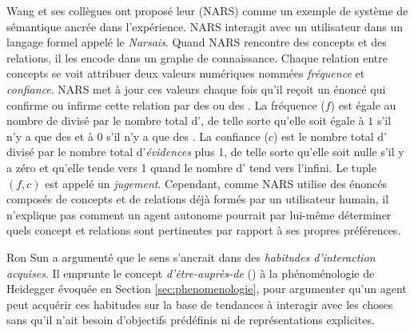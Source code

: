 Wang et ses collègues ont proposé leur  (NARS) comme un exemple de système de sémantique ancrée dans l'expérience. 
NARS interagit avec un utilisateur dans un langage formel appelé le \emph{Narsais}. 
Quand NARS rencontre des concepts et des relations, il les encode dans un graphe de connaissance.
Chaque relation entre concepts se voit attribuer deux valeurs numériques nommées \emph{fréquence} et \emph{confiance}.
NARS met à jour ces valeurs chaque fois qu'il reçoit un énoncé qui confirme ou infirme cette relation par des  ou des . 
La fréquence ($f$) est égale au nombre de  divisé par le nombre total d', de telle sorte qu'elle soit égale à $1$ s'il n'y a que des  et à 0 s'il n'y a que des .
La confiance ($c$) est le nombre total d' divisé par le nombre total d'\emph{évidences} plus 1, de telle sorte qu'elle soit nulle s'il y a zéro  et qu'elle tende vers 1 quand le nombre d' tend vers l'infini. 
Le tuple $(f,c)$ est appelé un \emph{jugement}.
Cependant, comme NARS utilise des énoncés composés de concepts et de relations déjà formés par un utilisateur humain, il n'explique pas comment un agent autonome pourrait par lui-même déterminer quels concept et relations sont pertinentes par rapport à ses propres préférences. 

Ron Sun \cite[]{sun_symbol_2000} a argumenté que le sens s'ancrait dans des  \emph{habitudes d'interaction acquises}.
Il emprunte le concept \emph{d'être-auprès-de} () à la phénoménologie de Heidegger évoquée en Section \ref{sec:phenomenologie}, pour argumenter qu'un agent peut acquérir ces habitudes sur la base de tendances à interagir avec les choses sans qu'il n'ait besoin d'objectifs prédéfinis ni de représentations explicites.   

